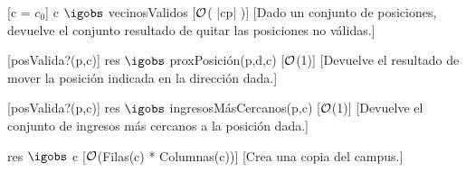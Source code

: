 \begin{Interfaz}
	[c = $c_0$]
	{c $\igobs$ vecinosValidos}
	[$\mathcal{O}$( |cp| )]
	[Dado un conjunto de posiciones, devuelve el conjunto resultado de quitar las posiciones no válidas.]
	
	[posValida?(p,c)]
	{res $\igobs$ proxPosición(p,d,c)}
	[$\mathcal{O}$(1)]
	[Devuelve el resultado de mover la posición indicada en la dirección dada.]
		
	[posValida?(p,c)]
	{res $\igobs$ ingresosMásCercanos(p,c)}
	[$\mathcal{O}$(1)]
	[Devuelve el conjunto de ingresos más cercanos a la posición dada.]
	
	{res $\igobs$ c}
	[$\mathcal{O}$(Filas(c) * Columnas(c))]
	[Crea una copia del campus.]
				
\end{Interfaz}

